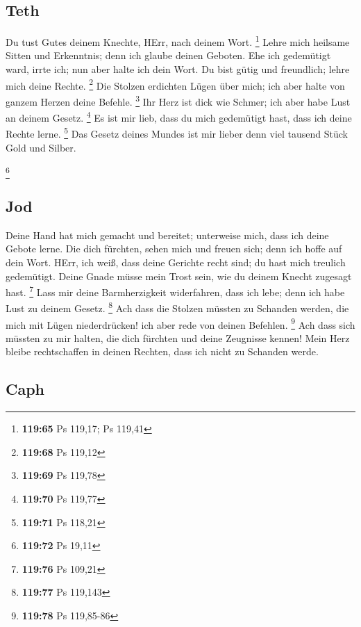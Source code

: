 \hypertarget{teth}{%
\subsection{Teth}\label{teth}}

 Du tust Gutes deinem Knechte, HErr, nach deinem Wort.
\footnote{\textbf{119:65} Ps 119,17; Ps 119,41}  Lehre
mich heilsame Sitten und Erkenntnis; denn ich glaube deinen Geboten.
 Ehe ich gedemütigt ward, irrte ich; nun aber halte ich
dein Wort.  Du bist gütig und freundlich; lehre mich
deine Rechte. \footnote{\textbf{119:68} Ps 119,12}  Die
Stolzen erdichten Lügen über mich; ich aber halte von ganzem Herzen
deine Befehle. \footnote{\textbf{119:69} Ps 119,78}  Ihr
Herz ist dick wie Schmer; ich aber habe Lust an deinem Gesetz.
\footnote{\textbf{119:70} Ps 119,77}  Es ist mir lieb,
dass du mich gedemütigt hast, dass ich deine Rechte lerne. \footnote{\textbf{119:71}
  Ps 118,21}  Das Gesetz deines Mundes ist mir lieber
denn viel tausend Stück Gold und Silber.

\footnote{\textbf{119:72} Ps 19,11}

\hypertarget{jod}{%
\subsection{Jod}\label{jod}}

 Deine Hand hat mich gemacht und bereitet; unterweise
mich, dass ich deine Gebote lerne.  Die dich fürchten,
sehen mich und freuen sich; denn ich hoffe auf dein Wort.
 HErr, ich weiß, dass deine Gerichte recht sind; du hast
mich treulich gedemütigt.  Deine Gnade müsse mein Trost
sein, wie du deinem Knecht zugesagt hast. \footnote{\textbf{119:76} Ps
  109,21}  Lass mir deine Barmherzigkeit widerfahren,
dass ich lebe; denn ich habe Lust zu deinem Gesetz. \footnote{\textbf{119:77}
  Ps 119,143}  Ach dass die Stolzen müssten zu Schanden
werden, die mich mit Lügen niederdrücken! ich aber rede von deinen
Befehlen. \footnote{\textbf{119:78} Ps 119,85-86}  Ach
dass sich müssten zu mir halten, die dich fürchten und deine Zeugnisse
kennen!  Mein Herz bleibe rechtschaffen in deinen
Rechten, dass ich nicht zu Schanden werde.

\hypertarget{caph}{%
\subsection{Caph}\label{caph}}

